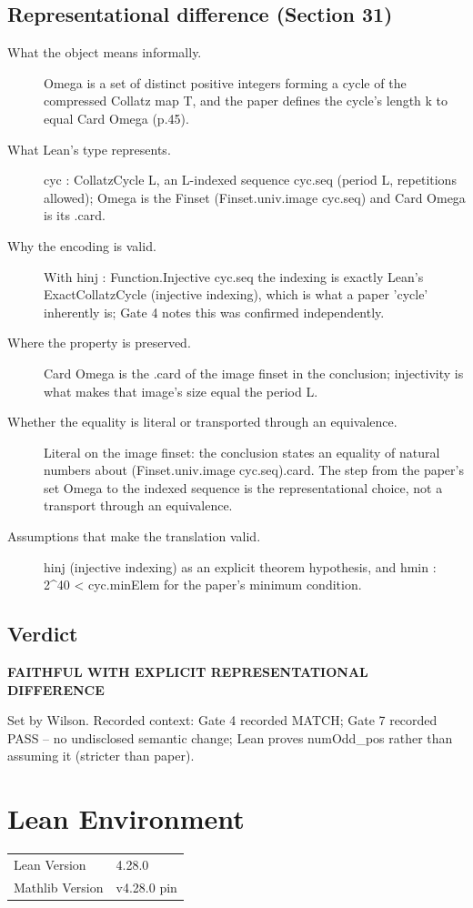 \documentclass[11pt]{article}
\begin{document}
\subsection*{Representational difference (Section 31)}
\begin{description}
\item[What the object means informally.] Omega is a set of distinct positive integers forming a cycle of the compressed Collatz map T, and the paper defines the cycle's length k to equal Card Omega (p.45).
\item[What Lean's type represents.] cyc : CollatzCycle L, an L-indexed sequence cyc.seq (period L, repetitions allowed); Omega is the Finset (Finset.univ.image cyc.seq) and Card Omega is its .card.
\item[Why the encoding is valid.] With hinj : Function.Injective cyc.seq the indexing is exactly Lean's ExactCollatzCycle (injective indexing), which is what a paper 'cycle' inherently is; Gate 4 notes this was confirmed independently.
\item[Where the property is preserved.] Card Omega is the .card of the image finset in the conclusion; injectivity is what makes that image's size equal the period L.
\item[Whether the equality is literal or transported through an equivalence.] Literal on the image finset: the conclusion states an equality of natural numbers about (Finset.univ.image cyc.seq).card. The step from the paper's set Omega to the indexed sequence is the representational choice, not a transport through an equivalence.
\item[Assumptions that make the translation valid.] hinj (injective indexing) as an explicit theorem hypothesis, and hmin : 2\textasciicircum{}40 < cyc.minElem for the paper's minimum condition.
\end{description}
\subsection*{Verdict}
\noindent\textbf{FAITHFUL WITH EXPLICIT REPRESENTATIONAL DIFFERENCE}\par Set by Wilson. Recorded context: Gate 4 recorded MATCH; Gate 7 recorded PASS -- no undisclosed semantic change; Lean proves numOdd\_pos rather than assuming it (stricter than paper).
\section{Lean Environment}
\begin{tabular}{@{}ll@{}}
\toprule
Lean Version & 4.28.0 \\
Mathlib Version & v4.28.0 pin \\
\bottomrule
\end{tabular}
\end{document}
